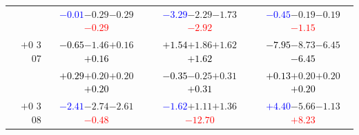 \documentclass[compress]{beamer}
\begin{document}
\begin{frame}
\begin{tabular}{r | c | c | c}
          & \textcolor{blue}{$-0.01$}\hspace{0.1 cm}$-0.29$\hspace{0.1 cm}$-0.29$\hspace{0.1 cm}\textcolor{red}{$-0.29$} & \textcolor{blue}{$-3.29$}\hspace{0.1 cm}$-2.29$\hspace{0.1 cm}$-1.73$\hspace{0.1 cm}\textcolor{red}{$-2.92$} & \textcolor{blue}{$-0.45$}\hspace{0.1 cm}$-0.19$\hspace{0.1 cm}$-0.19$\hspace{0.1 cm}\textcolor{red}{$-1.15$} \\
$+$0 3 07 & \textcolor{black}{$-0.65$}\hspace{0.1 cm}$-1.46$\hspace{0.1 cm}$+0.16$\hspace{0.1 cm}\textcolor{black}{$+0.16$} & \textcolor{black}{$+1.54$}\hspace{0.1 cm}$+1.86$\hspace{0.1 cm}$+1.62$\hspace{0.1 cm}\textcolor{black}{$+1.62$} & \textcolor{black}{$-7.95$}\hspace{0.1 cm}$-8.73$\hspace{0.1 cm}$-6.45$\hspace{0.1 cm}\textcolor{black}{$-6.45$} \\
          & \textcolor{black}{$+0.29$}\hspace{0.1 cm}$+0.20$\hspace{0.1 cm}$+0.20$\hspace{0.1 cm}\textcolor{black}{$+0.20$} & \textcolor{black}{$-0.35$}\hspace{0.1 cm}$-0.25$\hspace{0.1 cm}$+0.31$\hspace{0.1 cm}\textcolor{black}{$+0.31$} & \textcolor{black}{$+0.13$}\hspace{0.1 cm}$+0.20$\hspace{0.1 cm}$+0.20$\hspace{0.1 cm}\textcolor{black}{$+0.20$} \\
$+$0 3 08 & \textcolor{blue}{$-2.41$}\hspace{0.1 cm}$-2.74$\hspace{0.1 cm}$-2.61$\hspace{0.1 cm}\textcolor{red}{$-0.48$} & \textcolor{blue}{$-1.62$}\hspace{0.1 cm}$+1.11$\hspace{0.1 cm}$+1.36$\hspace{0.1 cm}\textcolor{red}{$-12.70$} & \textcolor{blue}{$+4.40$}\hspace{0.1 cm}$-5.66$\hspace{0.1 cm}$-1.13$\hspace{0.1 cm}\textcolor{red}{$+8.23$} \\

\end{tabular}
\end{frame}
\end{document}
